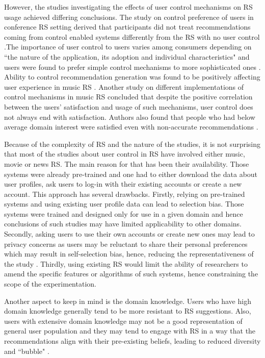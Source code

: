 \documentclass[a4paper,12pt]{article}
\begin{document}
However, the studies investigating the effects of user control mechanisms on RS usage achieved differing conclusions. The study on control preference of users in conference RS setting derived  that participants did not treat recommendations coming from control enabled systems differently from the RS with no user control  \citep{jameson2002pros}.The importance of user control to users varies among consumers depending on ``the nature of the application, its adoption and individual characteristics" and users were found to prefer simple control mechanisms to more sophisticated ones \citep{knijnenburg2011each, knijnenburgExplainingUserExperience2012}. Ability to control recommendation generation was found to be positively affecting user experience in music RS \citep{bostandjiev2012tasteweights, knijnenburgExplainingUserExperience2012}. Another study on different implementations of control mechanisms in music RS concluded that despite the positive correlation between the users' satisfaction and usage of such mechanisms, user control does not always end with satisfaction. Authors also found that people who had below average domain interest were satisfied even with non-accurate recommendations \citep{hijikataStudyUserIntervention2014}.

Because of the complexity of RS and the nature of the studies, it is not surprising that most of the studies about user control in RS have involved either music, movie or news RS. The main reason for that has been their availability. Those systems were already pre-trained and one had to either download the data about user profiles, ask users to log-in with their existing accounts or create a new account. This approach has several drawbacks. Firstly, relying on pre-trained systems and using existing user profile data can lead to selection bias. Those systems were trained and designed only for use in a given domain and hence conclusions of such studies may have limited applicability to other domains. Secondly, asking users to use their own accounts or create new ones may lead to privacy concerns as users may be reluctant to share their personal preferences which may result in self-selection bias, hence, reducing the representativeness of the study \citep{belanger2011privacy}. Thirdly, using existing RS would limit the ability of researchers to amend the specific features or algorithms of such systems, hence constraining the scope of the experimentation.

Another aspect to keep in mind is the domain knowledge. Users who have high domain knowledge generally tend to be more resistant to RS suggestions. Also, users with extensive domain knowledge may not be a good representation of general user population and they may tend to engage with RS in a way that the recommendations align with their pre-existing beliefs, leading to reduced diversity and ``bubble" \citep{mollerNotBlameIt2018}.  
\end{document}
